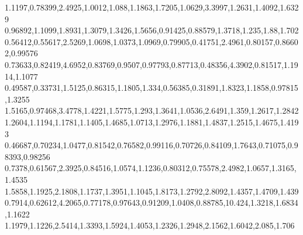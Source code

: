 1.1197,0.78399,2.4925,1.0012,1.088,1.1863,1.7205,1.0629,3.3997,1.2631,1.4092,1.6329
0.96892,1.1099,1.8931,1.3079,1.3426,1.5656,0.91425,0.88579,1.3718,1.235,1.88,1.702
0.56412,0.55617,2.5269,1.0698,1.0373,1.0969,0.79905,0.41751,2.4961,0.80157,0.86602,0.99576
0.73633,0.82419,4.6952,0.83769,0.9507,0.97793,0.87713,0.48356,4.3902,0.81517,1.1914,1.1077
0.49587,0.33731,1.5125,0.86315,1.1805,1.334,0.56385,0.31891,1.8323,1.1858,0.97815,1.3255
1.5165,0.97468,3.4778,1.4221,1.5775,1.293,1.3641,1.0536,2.6491,1.359,1.2617,1.2842
1.2604,1.1194,1.1781,1.1405,1.4685,1.0713,1.2976,1.1881,1.4837,1.2515,1.4675,1.4193
0.46687,0.70234,1.0477,0.81542,0.76582,0.99116,0.70726,0.84109,1.7643,0.71075,0.98393,0.98256
0.7378,0.61567,2.3925,0.84516,1.0574,1.1236,0.80312,0.75578,2.4982,1.0657,1.3165,1.4535
1.5858,1.1925,2.1808,1.1737,1.3951,1.1045,1.8173,1.2792,2.8092,1.4357,1.4709,1.439
0.7914,0.62612,4.2065,0.77178,0.97643,0.91209,1.0408,0.88785,10.424,1.3218,1.6834,1.1622
1.1979,1.1226,2.5414,1.3393,1.5924,1.4053,1.2326,1.2948,2.1562,1.6042,2.085,1.706
